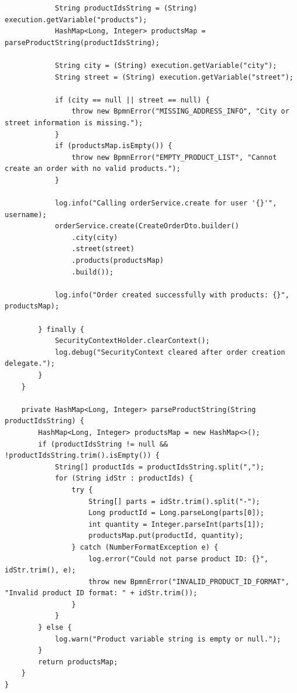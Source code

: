 \documentclass{article}
\begin{document}
\begin{lstlisting}
            String productIdsString = (String) execution.getVariable("products");
            HashMap<Long, Integer> productsMap = parseProductString(productIdsString);

            String city = (String) execution.getVariable("city");
            String street = (String) execution.getVariable("street");

            if (city == null || street == null) {
                throw new BpmnError("MISSING_ADDRESS_INFO", "City or street information is missing.");
            }
            if (productsMap.isEmpty()) {
                throw new BpmnError("EMPTY_PRODUCT_LIST", "Cannot create an order with no valid products.");
            }

            log.info("Calling orderService.create for user '{}'", username);
            orderService.create(CreateOrderDto.builder()
                .city(city)
                .street(street)
                .products(productsMap)
                .build());

            log.info("Order created successfully with products: {}", productsMap);

        } finally {
            SecurityContextHolder.clearContext();
            log.debug("SecurityContext cleared after order creation delegate.");
        }
    }

    private HashMap<Long, Integer> parseProductString(String productIdsString) {
        HashMap<Long, Integer> productsMap = new HashMap<>();
        if (productIdsString != null && !productIdsString.trim().isEmpty()) {
            String[] productIds = productIdsString.split(",");
            for (String idStr : productIds) {
                try {
                    String[] parts = idStr.trim().split("-");
                    Long productId = Long.parseLong(parts[0]);
                    int quantity = Integer.parseInt(parts[1]);
                    productsMap.put(productId, quantity);
                } catch (NumberFormatException e) {
                    log.error("Could not parse product ID: {}", idStr.trim(), e);
                    throw new BpmnError("INVALID_PRODUCT_ID_FORMAT", "Invalid product ID format: " + idStr.trim());
                }
            }
        } else {
            log.warn("Product variable string is empty or null.");
        }
        return productsMap;
    }
}
\end{lstlisting}
\end{document}
